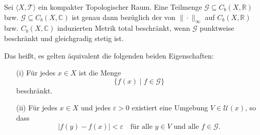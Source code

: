 {
    Sei $\langle X, \mathcal{T} \rangle$ ein kompakter Topologischer Raum.
    Eine Teilmenge $\mathcal{G} \subseteq C_b(X, \mathbb{R})$ bzw. 
    $\mathcal{G} \subseteq C_b(X, \mathbb{C})$ ist genau dann bezüglich 
    der von $\|\cdot\|_\infty$ auf $C_b(X, \mathbb{R})$ bzw. 
    $C_b(X, \mathbb{C})$ induzierten Metrik total beschränkt, 
    wenn $\mathcal{G}$ punktweise beschränkt und gleichgradig stetig ist.

    Das heißt, es gelten äquivalent die folgenden beiden Eigenschaften:
    \begin{itemize}
        \item[(i)] Für jedes $x \in X$ ist die Menge 
        $$
        \{ f(x) \mid f \in \mathcal{G} \}
        $$
        beschränkt.

        \item[(ii)] Für jedes $x \in X$ und jedes $\varepsilon > 0$ 
        existiert eine Umgebung $V \in \mathcal{U}(x)$, so dass
        $$
        |f(y) - f(x)| < \varepsilon 
        \quad \text{für alle } y \in V \text{ und alle } f \in \mathcal{G}.
        $$
    \end{itemize}
}


